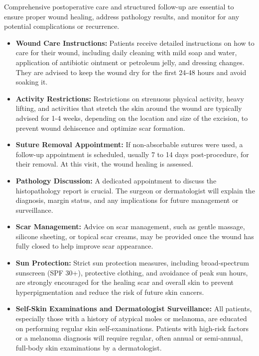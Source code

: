 Comprehensive postoperative care and structured follow-up are essential to ensure proper wound healing, address pathology results, and monitor for any potential complications or recurrence.

\begin{itemize}
  \item \textbf{Wound Care Instructions:} Patients receive detailed instructions on how to care for their wound, including daily cleaning with mild soap and water, application of antibiotic ointment or petroleum jelly, and dressing changes. They are advised to keep the wound dry for the first 24-48 hours and avoid soaking it.
  
  \item \textbf{Activity Restrictions:} Restrictions on strenuous physical activity, heavy lifting, and activities that stretch the skin around the wound are typically advised for 1-4 weeks, depending on the location and size of the excision, to prevent wound dehiscence and optimize scar formation.
  
  \item \textbf{Suture Removal Appointment:} If non-absorbable sutures were used, a follow-up appointment is scheduled, usually 7 to 14 days post-procedure, for their removal. At this visit, the wound healing is assessed.
  
  \item \textbf{Pathology Discussion:} A dedicated appointment to discuss the histopathology report is crucial. The surgeon or dermatologist will explain the diagnosis, margin status, and any implications for future management or surveillance.
  
  \item \textbf{Scar Management:} Advice on scar management, such as gentle massage, silicone sheeting, or topical scar creams, may be provided once the wound has fully closed to help improve scar appearance.
  
  \item \textbf{Sun Protection:} Strict sun protection measures, including broad-spectrum sunscreen (SPF 30+), protective clothing, and avoidance of peak sun hours, are strongly encouraged for the healing scar and overall skin to prevent hyperpigmentation and reduce the risk of future skin cancers.
  
  \item \textbf{Self-Skin Examinations and Dermatologist Surveillance:} All patients, especially those with a history of atypical moles or melanoma, are educated on performing regular skin self-examinations. Patients with high-risk factors or a melanoma diagnosis will require regular, often annual or semi-annual, full-body skin examinations by a dermatologist.
\end{itemize}

